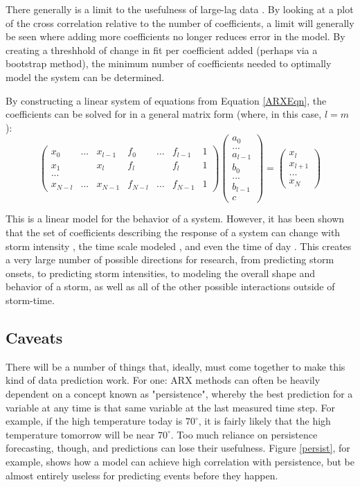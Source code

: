 \documentclass[10pt]{article}
\begin{document}
There generally is a limit to the usefulness of large-lag data \citep{ExtremeEvents}. By looking at a plot of the cross correlation relative to the number of coefficients, a limit will generally be seen where adding more coefficients no longer reduces error in the model. By creating a threshhold of change in fit per coefficient added (perhaps via a bootstrap method), the minimum number of coefficients needed to optimally model the system can be determined.

By constructing a linear system of equations from Equation \ref{ARXEqn}, the coefficients can be solved for in a general matrix form (where, in this case, $l=m$):
\[
\left( \begin{array}{ccccccc}
x_0 & ... & x_{l-1} & f_0 & ... & f_{l-1} & 1\\
x_1 &     & x_l & f_l &  &f_l & 1\\
... &     &     &     &  &   & \\
x_{N-l} & ... & x_{N-1} & f_{N-l} & ... & f_{N-1} & 1
\end{array} \right)
\left(\begin{array}{c}
a_0\\...\\a_{l-1}\\b_0\\...\\b_{l-1}\\c
\end{array}\right)
=
\left(
\begin{array}{c}
x_l \\ x_{l+1} \\ ... \\ x_{N}
\end{array}
\right)
\]

This is a linear model for the behavior of a system. However, it has been shown that the set of coefficients describing the response of a system can change with storm intensity \citep{ARXEqn}, the time scale modeled \citep{Coupling}, and even the time of day \citep{VBzAL}. This creates a very large number of possible directions for research, from predicting storm onsets, to predicting storm intensities, to modeling the overall shape and behavior of a storm, as well as all of the other possible interactions outside of storm-time. 

\subsection{Caveats}
There will be a number of things that, ideally, must come together to make this kind of data prediction work. For one: ARX methods can often be heavily dependent on a concept known as "persistence", whereby the best prediction for a variable at any time is that same variable at the last measured time step. For example, if the high temperature today is $70^\circ$, it is fairly likely that the high temperature tomorrow will be near $70^\circ$. Too much reliance on persistence forecasting, though, and predictions can lose their usefulness. Figure \ref{persist}, for example, shows how a model can achieve high correlation with persistence, but be almost entirely useless for predicting events before they happen.
\end{document}
